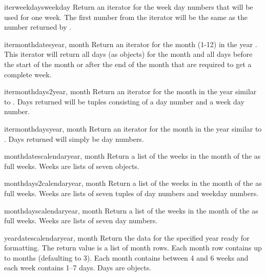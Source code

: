\begin{methoddesc}{iterweekdays}{weekday}
Return an iterator for the week day numbers that will be used
for one week. The first number from the iterator will be the
same as the number returned by .
\end{methoddesc}

\begin{methoddesc}{itermonthdates}{year, month}
Return an iterator for the month  (1-12) in the
year . This iterator will return all days (as
 objects) for the month and all days
before the start of the month or after the end of the month
that are required to get a complete week.
\end{methoddesc}

\begin{methoddesc}{itermonthdays2}{year, month}
Return an iterator for the month  in the year
 similar to . Days returned
will be tuples consisting of a day number and a week day
number.
\end{methoddesc}

\begin{methoddesc}{itermonthdays}{year, month}
Return an iterator for the month  in the year
 similar to . Days returned
will simply be day numbers.
\end{methoddesc}

\begin{methoddesc}{monthdatescalendar}{year, month}
Return a list of the weeks in the month  of
the  as full weeks. Weeks are lists of seven
 objects.
\end{methoddesc}

\begin{methoddesc}{monthdays2calendar}{year, month}
Return a list of the weeks in the month  of
the  as full weeks. Weeks are lists of seven
tuples of day numbers and weekday numbers.
\end{methoddesc}

\begin{methoddesc}{monthdayscalendar}{year, month}
Return a list of the weeks in the month  of
the  as full weeks. Weeks are lists of seven
day numbers.
\end{methoddesc}

\begin{methoddesc}{yeardatescalendar}{year, month}
Return the data for the specified year ready for formatting. The return
value is a list of month rows. Each month row contains up to 
months (defaulting to 3). Each month contains between 4 and 6 weeks and
each week contains 1--7 days. Days are  objects.
\end{methoddesc}

